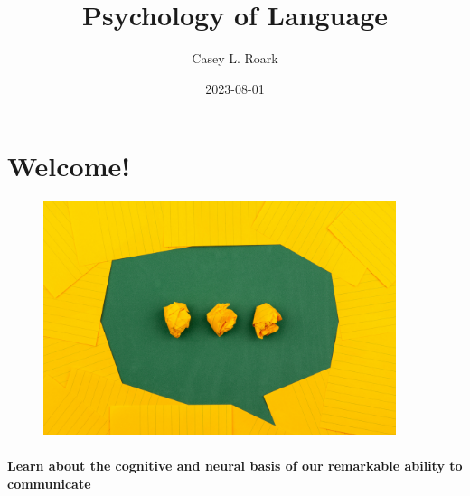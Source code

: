 \documentclass[
  letterpaper,
  DIV=11,
  numbers=noendperiod]{scrreprt}
\title{Psychology of Language}
\author{Casey L. Roark}
\date{2023-08-01}
\renewcommand*\contentsname{Table of contents}
\newcommand\contentsname{Table of contents}
\begin{document}
\maketitle
\ifdefined\Shaded\renewenvironment{Shaded}{\begin{tcolorbox}[boxrule=0pt, interior hidden, borderline west={3pt}{0pt}{shadecolor}, enhanced, breakable, sharp corners, frame hidden]}{\end{tcolorbox}}\fi

\renewcommand*\contentsname{Table of contents}
{
\hypersetup{linkcolor=}
\setcounter{tocdepth}{2}
\tableofcontents
}

\hypertarget{welcome}{%
\chapter*{Welcome!}\label{welcome}}


\begin{figure}

{\centering \includegraphics[width=4.0625in,height=\textheight]{images/volodymyr-hryshchenko-V5vqWC9gyEU-unsplash.jpg}

}

\end{figure}

\hypertarget{learn-about-the-cognitive-and-neural-basis-of-our-remarkable-ability-to-communicate}{%
\subsubsection*{Learn about the cognitive and neural basis of our
remarkable ability to
communicate}\label{learn-about-the-cognitive-and-neural-basis-of-our-remarkable-ability-to-communicate}}
\end{document}

